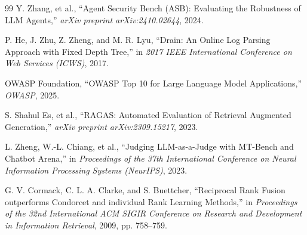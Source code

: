 \documentclass[12pt,a4paper]{article}
\begin{document}
\begin{thebibliography}{99}
    Y. Zhang, et al., ``Agent Security Bench (ASB): Evaluating the Robustness of LLM Agents,'' \emph{arXiv preprint arXiv:2410.02644}, 2024.

    P. He, J. Zhu, Z. Zheng, and M. R. Lyu, ``Drain: An Online Log Parsing Approach with Fixed Depth Tree,'' in \emph{2017 IEEE International Conference on Web Services (ICWS)}, 2017.

    OWASP Foundation, ``OWASP Top 10 for Large Language Model Applications,'' \emph{OWASP}, 2025.

    S. Shahul Es, et al., ``RAGAS: Automated Evaluation of Retrieval Augmented Generation,'' \emph{arXiv preprint arXiv:2309.15217}, 2023.

    L. Zheng, W.-L. Chiang, et al., ``Judging LLM-as-a-Judge with MT-Bench and Chatbot Arena,'' in \emph{Proceedings of the 37th International Conference on Neural Information Processing Systems (NeurIPS)}, 2023.

    G. V. Cormack, C. L. A. Clarke, and S. Buettcher, ``Reciprocal Rank Fusion outperforms Condorcet and individual Rank Learning Methods,'' in \emph{Proceedings of the 32nd International ACM SIGIR Conference on Research and Development in Information Retrieval}, 2009, pp. 758--759.

\end{thebibliography}
\end{document}
